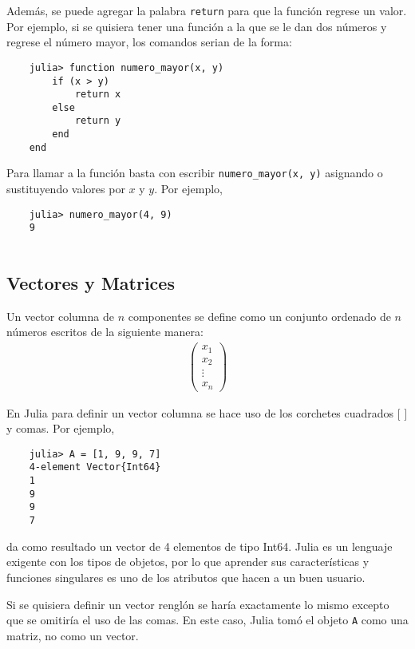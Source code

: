 Además, se puede agregar la palabra \texttt{return} para que la función regrese un valor. Por ejemplo, si se quisiera tener una función a la que se le dan dos números y regrese el número mayor, los comandos serian de la forma:

\begin{verbatim}
	julia> function numero_mayor(x, y)
		if (x > y)
			return x
		else
			return y
		end
	end
\end{verbatim}


Para llamar a la función basta con escribir \texttt{numero\_mayor(x, y)} asignando o sustituyendo valores por $x$ y $y$. Por ejemplo,

\begin{verbatim}
	julia> numero_mayor(4, 9)
	9
	
\end{verbatim}

\subsection{Vectores y Matrices}

Un vector columna de $n$ componentes se define como un conjunto ordenado de $n$ números escritos de la siguiente manera:
\begin{equation*}
    \begin{aligned}
    \begin{pmatrix}
    x_1 \\ 
    x_2 \\
    \vdots \\
    x_n
    \end{pmatrix} 
    \end{aligned}
\end{equation*}

En \textsf{Julia} para definir un vector columna se hace uso de los corchetes cuadrados $[$ $]$ y comas. Por ejemplo, 

\begin{verbatim}
	julia> A = [1, 9, 9, 7]
	4-element Vector{Int64}
	1
	9
	9
	7
\end{verbatim}

\noindent da como resultado un vector de 4 elementos de tipo Int64. \textsf{Julia} es un lenguaje exigente con los tipos de objetos, por lo que aprender sus características y funciones singulares es uno de los atributos que hacen a un buen usuario. 

Si se quisiera definir un vector renglón se haría exactamente lo mismo excepto que se omitiría el uso de las comas. En este caso, \textsf{Julia} tomó el objeto \texttt{A} como una matriz, no como un vector. 

